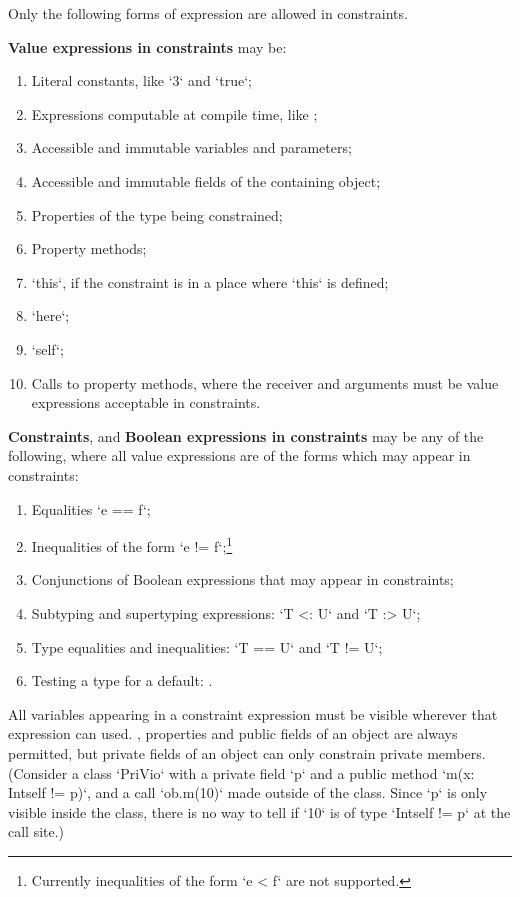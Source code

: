 Only the following forms of expression are allowed in constraints.  

{\bf Value expressions in constraints} may be: 
\begin{enumerate}
\item Literal constants, like \xcd`3` and \xcd`true`;
\item Expressions computable at compile time, like ;
\item Accessible and immutable variables and parameters;
\item Accessible and immutable fields of the containing object;
\item Properties of the type being constrained;
\item Property methods;
\item \xcd`this`, if the constraint is in a place where \xcd`this` is defined;
\item \xcd`here`;
\item \xcd`self`;
\item Calls to property methods, where the receiver and arguments must be
      value expressions acceptable in constraints.
\end{enumerate}


{\bf Constraints}, and {\bf Boolean expressions in constraints}  may be any of
the following, where 
all value expressions are of the forms which may appear in constraints: 
\begin{enumerate}
\item Equalities \xcd`e == f`;
\item Inequalities of the form \xcd`e != f`;\footnote{Currently inequalities
      of the form \xcd`e < f` are not supported.}
\item Conjunctions of Boolean expressions that may appear in constraints;
\item Subtyping and supertyping expressions: \xcd`T <: U` and \xcd`T :> U`; 
\item Type equalities and inequalities: \xcd`T == U` and \xcd`T != U`; 
\item Testing a type for a default: .
\end{enumerate}

All variables appearing in a constraint expression must be visible wherever
that expression can used.  \Eg, properties and public fields of an object are
always permitted, but private fields of an object can only constrain private
members.  (Consider a class \xcd`PriVio` with a private field \xcd`p` and a
public method \xcd`m(x: Int{self != p})`, and a call \xcd`ob.m(10)` made
outside of the class. Since \xcd`p` is only visible inside the class, there is
no way to tell if \xcd`10` is of type \xcd`Int{self != p}` at the call site.)

